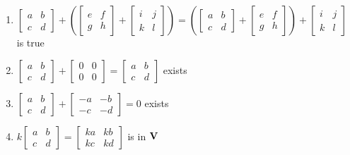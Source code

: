 \documentclass[12pt]{article}
\begin{document}
\begin{enumerate}
\begin{enumerate}
      \item $\begin{bmatrix} a & b\\ c & d  \end{bmatrix}+\left(\begin{bmatrix} e & f\\ g & h  \end{bmatrix}+\begin{bmatrix} i & j\\ k & l  \end{bmatrix}\right)=\left(\begin{bmatrix} a & b\\ c & d  \end{bmatrix}+\begin{bmatrix} e & f\\ g & h  \end{bmatrix}\right)+\begin{bmatrix} i & j\\ k & l  \end{bmatrix}$ is true \textcolor{green}{\checkmark} 

      \item $\begin{bmatrix} a & b\\ c & d  \end{bmatrix}+\begin{bmatrix} 0 & 0\\ 0 & 0  \end{bmatrix}=\begin{bmatrix} a & b\\ c & d  \end{bmatrix}$ exists \textcolor{green}{\checkmark}

      \item $\begin{bmatrix} a & b\\ c & d  \end{bmatrix}+\begin{bmatrix} -a & -b\\ -c & -d  \end{bmatrix}=0$ exists \textcolor{green}{\checkmark}

      \item $k\begin{bmatrix} a & b\\ c & d  \end{bmatrix}=\begin{bmatrix} ka & kb\\ kc & kd  \end{bmatrix}$ is in $\bold{V}$ \textcolor{green}{\checkmark}


\end{enumerate}
\end{enumerate}
\end{document}
